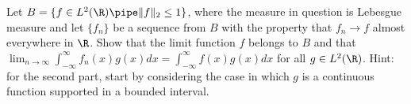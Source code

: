 Let $B=\{f\in L^2(\R)\pipe \|f\|_2\leq 1\}$, where the measure in
question is Lebesgue measure and let $\{f_n\}$ be a sequence from $B$
with the property that $f_n\rightarrow f$ almost everywhere in
$\R$. Show that the limit function $f$ belongs to $B$ and that
$\lim_{n\rightarrow \infty}\int_{-\infty}^{\infty}f_n(x)g(x)dx
=\int_{-\infty}^{\infty}f(x)g(x)dx$ for all $g\in L^2(\R)$. Hint: for
the second part, start by considering the case in which $g$ is a
continuous function supported in a bounded interval.
